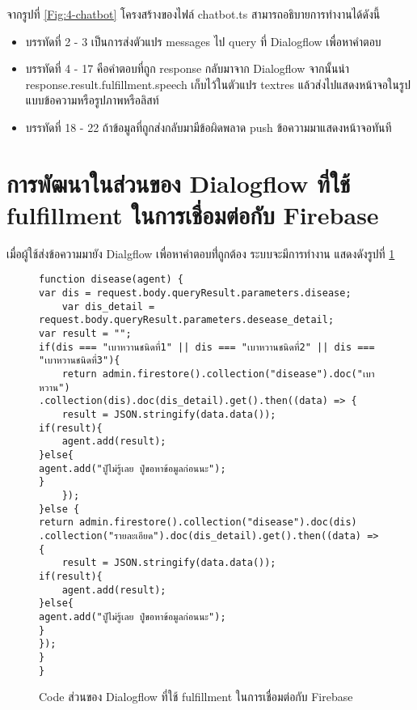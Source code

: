 จากรูปที่ \ref{Fig:4-chatbot} โครงสร้างของไฟล์ chatbot.ts สามารถอธิบายการทำงานได้ดังนี้
\begin{itemize}[label={--}]
\item บรรทัดที่ 2 - 3 เป็นการส่งตัวแปร messages ไป query ที่ Dialogflow เพื่อหาคำตอบ
\item บรรทัดที่ 4 - 17 คือคำตอบที่ถูก response กลับมาจาก Dialogflow จากนั้นนำ response.result.fulfillment.speech เก็บไว้ในตัวแปร textres แล้วส่งไปแสดงหน้าจอในรูปแบบข้อความหรือรูปภาพหรือลิสท์
\item บรรทัดที่ 18 - 22 ถ้าข้อมูลที่ถูกส่งกลับมามีข้อผิดพลาด push ข้อความมาแสดงหน้าจอทันที
\end{itemize}
\newpage



\section{การพัฒนาในส่วนของ Dialogflow ที่ใช้ fulfillment ในการเชื่อมต่อกับ Firebase}
เมื่อผู้ใช้ส่งข้อความมายัง Dialgflow เพื่อหาคำตอบที่่ถูกต้อง ระบบจะมีการทำงาน แสดงดังรูปที่ \ref{Fig:4-addchatbot}
\begin{figure}[H]
	{\begin{lstlisting}
function disease(agent) {
var dis = request.body.queryResult.parameters.disease;
	var dis_detail = request.body.queryResult.parameters.desease_detail;
var result = "";
if(dis === "เบาหวานชนิดที่1" || dis === "เบาหวานชนิดที่2" || dis === "เบาหวานชนิดที่3"){
	return admin.firestore().collection("disease").doc("เบาหวาน")
.collection(dis).doc(dis_detail).get().then((data) => {
	result = JSON.stringify(data.data());
if(result){
	agent.add(result);
}else{
agent.add("ปู่ไม่รู้เลย ปู่ขอหาข้อมูลก่อนนะ");
} 
	});
}else {
return admin.firestore().collection("disease").doc(dis)
.collection("รายละเอียด").doc(dis_detail).get().then((data) => {
	result = JSON.stringify(data.data());
if(result){
	agent.add(result);
}else{
agent.add("ปู่ไม่รู้เลย ปู่ขอหาข้อมูลก่อนนะ");
}
});
}
}
	\end{lstlisting}}
	\caption{Code ส่วนของ Dialogflow ที่ใช้ fulfillment ในการเชื่อมต่อกับ Firebase}
	\label{Fig:4-addchatbot}
\end{figure}
\newpage

